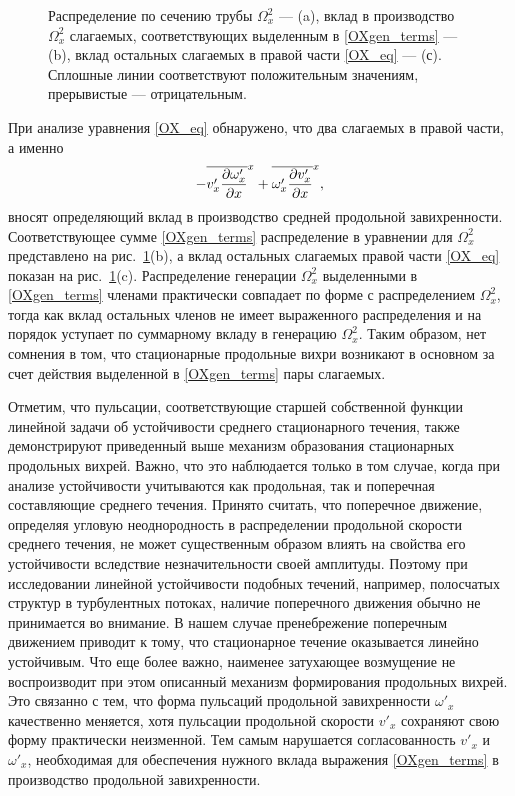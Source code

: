 \begin{figure}
\caption{Распределение по сечению трубы $\Omega_x^2$ --- (a), вклад в производство $\Omega_x^2$ слагаемых, соответствующих выделенным в \eqref{OXgen_terms} --- (b), вклад остальных слагаемых в правой части \eqref{OX_eq} --- (с). Сплошные линии соответствуют положительным значениям, прерывистые --- отрицательным.}
\label{OXgen_pic}
\end{figure}

При анализе уравнения \eqref{OX_eq} обнаружено, что два слагаемых в правой части, а именно
\begin{equation}\label{OXgen_terms}
 - \overline{v'_x \frac{\partial \omega'_x}{\partial x}}^x + \overline{ \omega'_x \frac{\partial v'_x}{\partial x} }^x,
\end{equation}
вносят определяющий вклад в производство средней продольной завихренности. Соответствующее сумме \eqref{OXgen_terms}  распределение в уравнении для $\Omega_x^2$ представлено на рис.~\ref{OXgen_pic}(b), а вклад остальных слагаемых правой части \eqref{OX_eq} показан на рис.~\ref{OXgen_pic}(c). Распределение генерации $\Omega_x^2$ выделенными в \eqref{OXgen_terms} членами практически совпадает по форме с распределением $\Omega_x^2$, тогда как вклад остальных членов не имеет выраженного распределения и на порядок уступает по суммарному вкладу в генерацию $\Omega_x^2$. Таким образом, нет сомнения в том, что стационарные продольные вихри возникают в основном за счет действия выделенной в \eqref{OXgen_terms} пары слагаемых.

Отметим, что пульсации, соответствующие старшей собственной функции линейной задачи об устойчивости среднего стационарного течения, также демонстрируют приведенный выше механизм образования стационарных продольных вихрей. Важно, что это наблюдается только в том случае, когда при анализе устойчивости учитываются как продольная, так и поперечная составляющие среднего течения. Принято считать, что поперечное движение, определяя угловую неоднородность в распределении продольной скорости среднего течения, не может существенным образом влиять на свойства его устойчивости вследствие незначительности своей амплитуды. Поэтому при исследовании линейной устойчивости подобных течений, например, полосчатых структур в турбулентных потоках, наличие поперечного движения обычно не принимается во внимание. В нашем случае пренебрежение поперечным движением приводит к тому, что стационарное течение оказывается линейно устойчивым. Что еще более важно, наименее затухающее возмущение не воспроизводит при этом описанный механизм формирования продольных вихрей. Это связанно с тем, что форма пульсаций продольной завихренности $\omega'_x$ качественно меняется, хотя пульсации продольной скорости $v'_x$ сохраняют свою форму практически неизменной. Тем самым нарушается согласованность  $v'_x$ и $\omega'_x$, необходимая для обеспечения нужного вклада выражения \eqref{OXgen_terms} в производство продольной завихренности.


